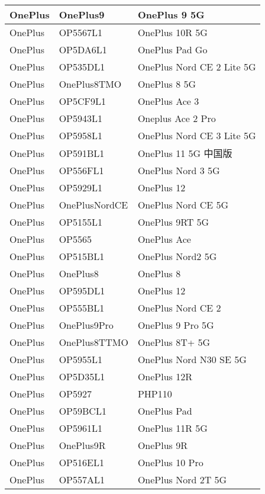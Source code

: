 \begin{tabularx}{\linewidth}{|l|X|X|}
        OnePlus & OnePlus9 & OnePlus 9 5G \\ \hline
        OnePlus & OP5567L1 & OnePlus 10R 5G \\ \hline
        OnePlus & OP5DA6L1 & OnePlus Pad Go \\ \hline
        OnePlus & OP535DL1 & OnePlus Nord CE 2 Lite 5G \\ \hline
        OnePlus & OnePlus8TMO & OnePlus 8 5G \\ \hline
        OnePlus & OP5CF9L1 & OnePlus Ace 3 \\ \hline
        OnePlus & OP5943L1 & Oneplus Ace 2 Pro \\ \hline
        OnePlus & OP5958L1 & OnePlus Nord CE 3 Lite 5G \\ \hline
        OnePlus & OP591BL1 & OnePlus 11 5G 中国版 \\ \hline
        OnePlus & OP556FL1 & OnePlus Nord 3 5G \\ \hline
        OnePlus & OP5929L1 & OnePlus 12 \\ \hline
        OnePlus & OnePlusNordCE & OnePlus Nord CE 5G \\ \hline
        OnePlus & OP5155L1 & OnePlus 9RT 5G \\ \hline
        OnePlus & OP5565 & OnePlus Ace \\ \hline
        OnePlus & OP515BL1 & OnePlus Nord2 5G \\ \hline
        OnePlus & OnePlus8 & OnePlus 8 \\ \hline
        OnePlus & OP595DL1 & OnePlus 12 \\ \hline
        OnePlus & OP555BL1 & OnePlus Nord CE 2 \\ \hline
        OnePlus & OnePlus9Pro & OnePlus 9 Pro 5G \\ \hline
        OnePlus & OnePlus8TTMO & OnePlus 8T+ 5G \\ \hline
        OnePlus & OP5955L1 & OnePlus Nord N30 SE 5G \\ \hline
        OnePlus & OP5D35L1 & OnePlus 12R \\ \hline
        OnePlus & OP5927 & PHP110 \\ \hline
        OnePlus & OP59BCL1 & OnePlus Pad \\ \hline
        OnePlus & OP5961L1 & OnePlus 11R 5G \\ \hline
        OnePlus & OnePlus9R & OnePlus 9R \\ \hline
        OnePlus & OP516EL1 & OnePlus 10 Pro \\ \hline
        OnePlus & OP557AL1 & OnePlus Nord 2T 5G \\ \hline

\end{tabularx}
